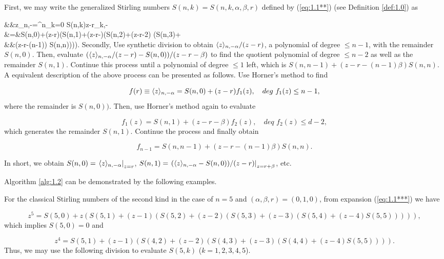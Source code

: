 \begin{algorithm}\label{alg:1.2}
First, we may write the generalized Stirling numbers $S(n,k)=S(n,k,\alpha, \beta, r)$ defined by (\ref{eq:1.1**}) (see Definition \ref{def:1.0}) as

\bn\label{eq:1.1***}
&&\la z\ra_{n,-\alpha}=\sum^n_{k=0} S(n,k)\la z-r\ra_{k,-\beta}\nonumber\\
&=&S(n,0)+(z-r)(S(n,1)+(z-r-\beta)(S(n,2)+(z-r-2\beta) (S(n,3)+\cdots \nonumber\\
&&(z-r-(n-1)\beta) S(n,n)))).
\en
Secondly, Use synthetic division to obtain $\langle z\rangle_{n,-\alpha}/(z-r)$, a polynomial of degree $\leq n-1$, with the remainder $S(n,0)$.
Then, evaluate $(\langle z\rangle_{n,-\alpha}/(z-r)-S(n,0) )/(z-r-\beta)$ to find the quotient polynomial of degree $\leq n-2$
as well as the remainder $S(n,1)$. Continue this process until a polynomial of degree $\leq 1$
left, which is $ S(n,n-1)+ (z-r-(n-1)\beta) S(n,n)$. A equivalent description of the above process can be presented as follows.
Use Horner's method to find

\[
f(r)\equiv \langle z\rangle_{n,-\alpha}=S(n,0)+(z-r) f_1(z),\quad deg \,\,f_1(z)\leq n-1,
\]
where the remainder is $S(n,0))$. Then, use Horner's method again to evaluate

\[
f_1(z) =S(n,1)+(z-r-\beta) f_2(z), \quad deq\,\, f_2(z)\leq d-2,
\]
which generates the remainder $S(n,1)$. Continue the process and finally obtain

\[
f_{n-1} =
S(n,n-1)+ (z-r-(n-1)\beta) S(n,n).
\]

In short, we obtain $S(n,0)=\left. \langle z\rangle_{n,-\alpha}\right|_{z=r}$, $S(n,1)=\left. (\langle z\rangle_{n,-\alpha}-S(n,0))/(z-r)\right|_{z=r+\beta}$, etc.
\end{algorithm}
Algorithm \ref{alg:1.2} can be demonstrated by the following examples.

\medbreak
{} For the classical Stirling numbers of the second kind in the case of $n=5$ and $(\alpha, \beta, r)=(0,1,0)$, from expansion (\ref{eq:1.1***}) we have

 \[
 z^5= S(5,0)+z(S(5,1) + (z-1) (S(5,2)+ (z-2) (S(5,3)+ (z-3) (S(5,4)+(z-4)S(5,5))))),
 \]
which implies $S(5,0)=0$ and

\[
z^4= S(5,1) + (z-1) (S(4,2)+ (z-2) (S(4,3)+ (z-3) (S(4,4)+(z-4)S(5,5)))).
 \]
Thus, we may use the following division to evaluate $S(5,k)$ ($k=1,2,3,4,5$).


